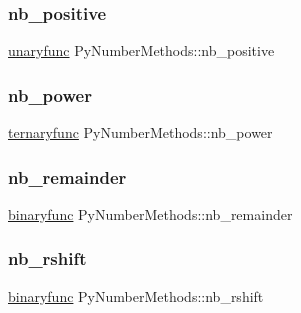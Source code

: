 \mbox{\label{struct_py_number_methods_adca8072483c63243de4d26d0575e6e8d}} 
\subsubsection{\texorpdfstring{nb\_positive}{nb\_positive}}
{\footnotesize\ttfamily \mbox{\hyperlink{_python27_2object_8h_aeda2d77a292fdf2c686151d24b3dbf5a}{unaryfunc}} Py\+Number\+Methods\+::nb\+\_\+positive}

\mbox{\label{struct_py_number_methods_a41e3d866693e4d036b8f6c19e005d2e0}} 
\subsubsection{\texorpdfstring{nb\_power}{nb\_power}}
{\footnotesize\ttfamily \mbox{\hyperlink{_python27_2object_8h_a3304ec7aa95ae9f0141c3b04e20f8394}{ternaryfunc}} Py\+Number\+Methods\+::nb\+\_\+power}

\mbox{\label{struct_py_number_methods_ac5faf4e85e1044648b75d87b980810f6}} 
\subsubsection{\texorpdfstring{nb\_remainder}{nb\_remainder}}
{\footnotesize\ttfamily \mbox{\hyperlink{_python27_2object_8h_a1a50b2d154f36acb9d215f2cdc1561a8}{binaryfunc}} Py\+Number\+Methods\+::nb\+\_\+remainder}

\mbox{\label{struct_py_number_methods_a5a5c35ddb101f3d16b0558daf4676e6f}} 
\subsubsection{\texorpdfstring{nb\_rshift}{nb\_rshift}}
{\footnotesize\ttfamily \mbox{\hyperlink{_python27_2object_8h_a1a50b2d154f36acb9d215f2cdc1561a8}{binaryfunc}} Py\+Number\+Methods\+::nb\+\_\+rshift}

